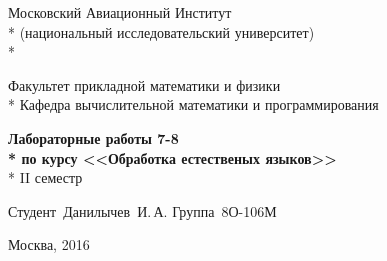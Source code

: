 \begin{titlepage}

\newpage

\begin{center}
Московский Авиационный Институт \\*
(национальный исследовательский университет) \\*

\vspace{2em}

Факультет прикладной математики и физики \\*
Кафедра вычислительной математики и программирования

\vspace{20em}

\Large \textbf{Лабораторные работы 7-8 \\*
по курсу <<Обработка естественых языков>>} \\*
II семестр

\end{center}

\vspace{15em}

\hspace{30em}\vbox{
	\hbox{Студент Данилычев И.\,А.}
	\hbox{Группа 8О-106М}
}

\vspace{\fill}

\begin{center}
Москва, 2016
\end{center}

\end{titlepage}
